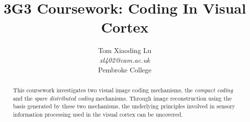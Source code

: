 \documentclass[journal]{IEEEtran}
\begin{document}
\title{3G3 Coursework: Coding In Visual Cortex}

\author{Tom Xiaoding Lu\\
				\textit{xl402@cam.ac.uk}\\
				Pembroke College\\%
} %
\maketitle

\begin{abstract}
This coursework investigates two visual image coding mechanisms, the \textit{compact coding} and the \textit{spare distributed coding} mechanisms. Through image reconstruction using the basis generated by these two mechanisms, the underlying principles involved in sensory information processing used in the visual cortex can be uncovered. \end{abstract}
\end{document}
